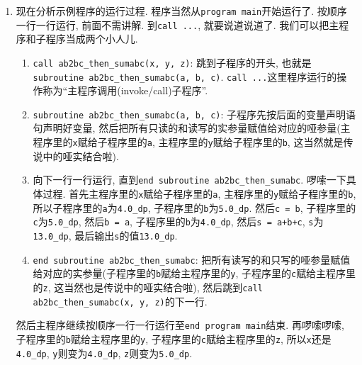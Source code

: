 \begin{enumerate}
    \item 现在分析示例程序的运行过程. 程序当然从\texttt{program main}开始运行了. 按顺序一行一行运行, 前面不需讲解. 到\texttt{call ...}, 就要说道说道了. 我们可以把主程序和子程序当成两个小人儿.\begin{enumerate}
        \item \texttt{call ab2bc\_{}then\_{}sumabc(x, y, z)}: 跳到子程序的开头, 也就是\texttt{subroutine ab2bc\_{}then\_{}sumabc(a, b, c)}. \texttt{call ...}这里程序运行的操作称为``主程序调用(invoke/call)子程序''.
        \item \texttt{subroutine ab2bc\_{}then\_{}sumabc(a, b, c)}: 子程序先按后面的变量声明语句声明好变量, 然后把所有只读的和读写的实参量赋值给对应的哑参量(主程序里的\texttt{x}赋给子程序里的\texttt{a}, 主程序里的\texttt{y}赋给子程序里的\texttt{b}, 这当然就是传说中的哑实结合啦).
        \item 向下一行一行运行, 直到\texttt{end subroutine ab2bc\_{}then\_{}sumabc}. 啰嗦一下具体过程. 首先主程序里的\texttt{x}赋给子程序里的\texttt{a}, 主程序里的\texttt{y}赋给子程序里的\texttt{b}, 所以子程序里的\texttt{a}为\texttt{4.0\_{}dp}, 子程序里的\texttt{b}为\texttt{5.0\_{}dp}. 然后\texttt{c = b}, 子程序里的\texttt{c}为\texttt{5.0\_{}dp}, 然后\texttt{b = a}, 子程序里的\texttt{b}为\texttt{4.0\_{}dp}, 然后\texttt{s = a+b+c}, \texttt{s}为\texttt{13.0\_{}dp}, 最后输出\texttt{s}的值\texttt{13.0\_{}dp}.
        \item \texttt{end subroutine ab2bc\_{}then\_{}sumabc}: 把所有读写的和只写的哑参量赋值给对应的实参量(子程序里的\texttt{b}赋给主程序里的\texttt{y}, 子程序里的\texttt{c}赋给主程序里的\texttt{z}, 这当然也是传说中的哑实结合啦), 然后跳到\texttt{call ab2bc\_{}then\_{}sumabc(x, y, z)}的下一行.
    \end{enumerate}然后主程序继续按顺序一行一行运行至\texttt{end program main}结束. 再啰嗦啰嗦, 子程序里的\texttt{b}赋给主程序里的\texttt{y}, 子程序里的\texttt{c}赋给主程序里的\texttt{z}, 所以\texttt{x}还是\texttt{4.0\_{}dp}, \texttt{y}则变为\texttt{4.0\_{}dp}, \texttt{z}则变为\texttt{5.0\_{}dp}.
\end{enumerate}

